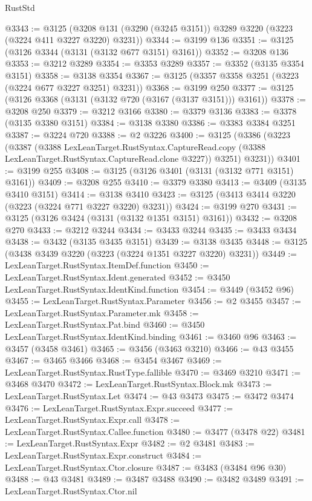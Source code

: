 \begin{lexlean}{RustStd}
\begin{coremodule}
@3343 := @3125 (@3208 @131 (@3290 (@3245 @3151)) @3289 @3220 (@3223 (@3224 @411 @3227 @3220) @3231))
@3344 := @3199 @136
@3351 := @3125 (@3126 @3344 (@3131 (@3132 @677 @3151) @3161))
@3352 := @3208 @136
@3353 := @3212 @3289
@3354 := @3353 @3289
@3357 := @3352 (@3135 @3354 @3151)
@3358 := @3138 @3354
@3367 := @3125 (@3357 @3358 @3251 (@3223 (@3224 @677 @3227 @3251) @3231))
@3368 := @3199 @250
@3377 := @3125 (@3126 @3368 (@3131 (@3132 @720 (@3167 (@3137 @3151))) @3161))
@3378 := @3208 @250
@3379 := @3212 @3166
@3380 := @3379 @3136
@3383 := @3378 (@3135 @3380 @3151)
@3384 := @3138 @3380
@3386 := @3383 @3384 @3251
@3387 := @3224 @720
@3388 := @2 @3226
@3400 := @3125
    (@3386
      (@3223
        (@3387
          (@3388
            LexLeanTarget.RustSyntax.CaptureRead.copy
            (@3388 LexLeanTarget.RustSyntax.CaptureRead.clone @3227))
          @3251)
        @3231))
@3401 := @3199 @255
@3408 := @3125 (@3126 @3401 (@3131 (@3132 @771 @3151) @3161))
@3409 := @3208 @255
@3410 := @3379 @3380
@3413 := @3409 (@3135 @3410 @3151)
@3414 := @3138 @3410
@3423 := @3125 (@3413 @3414 @3220 (@3223 (@3224 @771 @3227 @3220) @3231))
@3424 := @3199 @270
@3431 := @3125 (@3126 @3424 (@3131 (@3132 @1351 @3151) @3161))
@3432 := @3208 @270
@3433 := @3212 @3244
@3434 := @3433 @3244
@3435 := @3433 @3434
@3438 := @3432 (@3135 @3435 @3151)
@3439 := @3138 @3435
@3448 := @3125 (@3438 @3439 @3220 (@3223 (@3224 @1351 @3227 @3220) @3231))
@3449 := LexLeanTarget.RustSyntax.ItemDef.function
@3450 := LexLeanTarget.RustSyntax.Ident.generated
@3452 := @3450 LexLeanTarget.RustSyntax.IdentKind.function
@3454 := @3449 (@3452 @96)
@3455 := LexLeanTarget.RustSyntax.Parameter
@3456 := @2 @3455
@3457 := LexLeanTarget.RustSyntax.Parameter.mk
@3458 := LexLeanTarget.RustSyntax.Pat.bind
@3460 := @3450 LexLeanTarget.RustSyntax.IdentKind.binding
@3461 := @3460 @96
@3463 := @3457 (@3458 @3461)
@3465 := @3456 (@3463 @3210)
@3466 := @43 @3455
@3467 := @3465 @3466
@3468 := @3454 @3467
@3469 := LexLeanTarget.RustSyntax.RustType.fallible
@3470 := @3469 @3210
@3471 := @3468 @3470
@3472 := LexLeanTarget.RustSyntax.Block.mk
@3473 := LexLeanTarget.RustSyntax.Let
@3474 := @43 @3473
@3475 := @3472 @3474
@3476 := LexLeanTarget.RustSyntax.Expr.succeed
@3477 := LexLeanTarget.RustSyntax.Expr.call
@3478 := LexLeanTarget.RustSyntax.Callee.function
@3480 := @3477 (@3478 @22)
@3481 := LexLeanTarget.RustSyntax.Expr
@3482 := @2 @3481
@3483 := LexLeanTarget.RustSyntax.Expr.construct
@3484 := LexLeanTarget.RustSyntax.Ctor.closure
@3487 := @3483 (@3484 @96 @30)
@3488 := @43 @3481
@3489 := @3487 @3488
@3490 := @3482 @3489
@3491 := LexLeanTarget.RustSyntax.Ctor.nil

\end{coremodule}
\end{lexlean}

